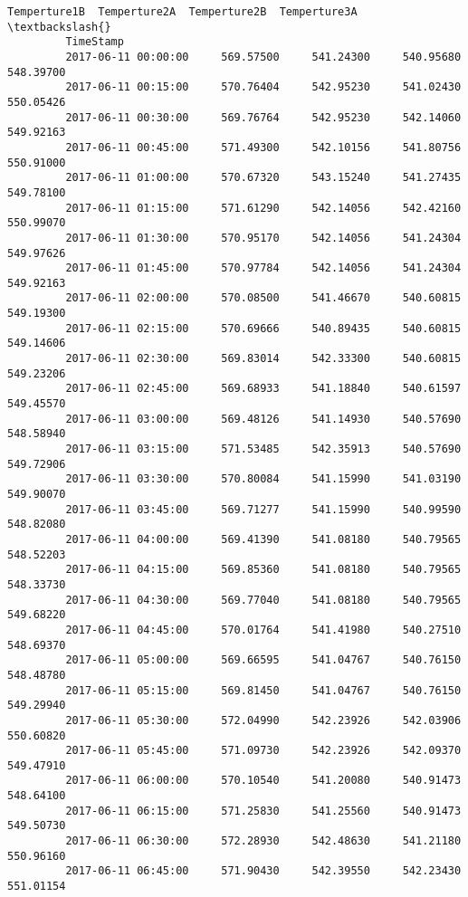 \documentclass[11pt]{article}
\begin{document}
\begin{Verbatim}[commandchars=\\\{\}]
                              Temperture1B  Temperture2A  Temperture2B  Temperture3A  \textbackslash{}
         TimeStamp                                                                     
         2017-06-11 00:00:00     569.57500     541.24300     540.95680     548.39700   
         2017-06-11 00:15:00     570.76404     542.95230     541.02430     550.05426   
         2017-06-11 00:30:00     569.76764     542.95230     542.14060     549.92163   
         2017-06-11 00:45:00     571.49300     542.10156     541.80756     550.91000   
         2017-06-11 01:00:00     570.67320     543.15240     541.27435     549.78100   
         2017-06-11 01:15:00     571.61290     542.14056     542.42160     550.99070   
         2017-06-11 01:30:00     570.95170     542.14056     541.24304     549.97626   
         2017-06-11 01:45:00     570.97784     542.14056     541.24304     549.92163   
         2017-06-11 02:00:00     570.08500     541.46670     540.60815     549.19300   
         2017-06-11 02:15:00     570.69666     540.89435     540.60815     549.14606   
         2017-06-11 02:30:00     569.83014     542.33300     540.60815     549.23206   
         2017-06-11 02:45:00     569.68933     541.18840     540.61597     549.45570   
         2017-06-11 03:00:00     569.48126     541.14930     540.57690     548.58940   
         2017-06-11 03:15:00     571.53485     542.35913     540.57690     549.72906   
         2017-06-11 03:30:00     570.80084     541.15990     541.03190     549.90070   
         2017-06-11 03:45:00     569.71277     541.15990     540.99590     548.82080   
         2017-06-11 04:00:00     569.41390     541.08180     540.79565     548.52203   
         2017-06-11 04:15:00     569.85360     541.08180     540.79565     548.33730   
         2017-06-11 04:30:00     569.77040     541.08180     540.79565     549.68220   
         2017-06-11 04:45:00     570.01764     541.41980     540.27510     548.69370   
         2017-06-11 05:00:00     569.66595     541.04767     540.76150     548.48780   
         2017-06-11 05:15:00     569.81450     541.04767     540.76150     549.29940   
         2017-06-11 05:30:00     572.04990     542.23926     542.03906     550.60820   
         2017-06-11 05:45:00     571.09730     542.23926     542.09370     549.47910   
         2017-06-11 06:00:00     570.10540     541.20080     540.91473     548.64100   
         2017-06-11 06:15:00     571.25830     541.25560     540.91473     549.50730   
         2017-06-11 06:30:00     572.28930     542.48630     541.21180     550.96160   
         2017-06-11 06:45:00     571.90430     542.39550     542.23430     551.01154   

\end{Verbatim}
\end{document}
